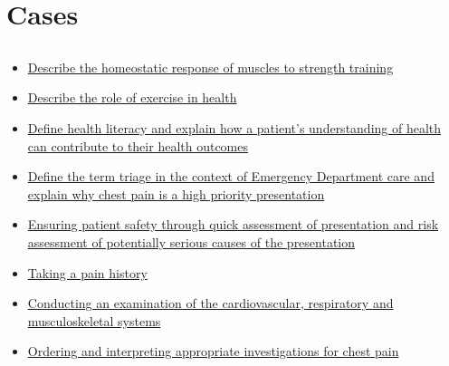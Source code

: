 \documentclass[10pt, a4paper]{article}
\newcommand{\MYhref}[3][blue]{\href{#2}{\color{#1}{#3}}}%
\begin{document}
\section{Cases}
\subsection{\MYhref[melbBlue]{https://notion.so/850b08c0537947a99c56eba6593b1303}{Ben Wesley - Chest Pain [DOMS]}} \begin{itemize} \item \href{https://www.notion.so/0c5126f649f047748dc4d64b4532f80f}{Describe the homeostatic response of muscles to strength training} \item \href{https://www.notion.so/62d5ca06b8964976878b641834967bfb}{Describe the role of exercise in health} \item \href{https://www.notion.so/76d3cd96be864960b318798b9d8bbd64}{Define health literacy and explain how a patient’s understanding of health can contribute to their health outcomes} \item \href{https://www.notion.so/5aec744383eb4ce8b6275d871ff052eb}{Define the term triage in the context of Emergency Department care and explain why chest pain is a high priority presentation} \item \href{https://www.notion.so/8002f730b9b940008cd3561c79255240}{Ensuring patient safety through quick assessment of presentation and risk assessment of potentially serious causes of the presentation} \item \href{https://www.notion.so/072e9c32508043fcb3706c40713c2788}{Taking a pain history} \item \href{https://www.notion.so/a3a64c1db01b49f5b9c88574d17af0ba}{Conducting an examination of the cardiovascular, respiratory and musculoskeletal systems} \item \href{https://www.notion.so/6cd37028ad2840489f4db843c10a9727}{Ordering and interpreting appropriate investigations for chest pain} \end{itemize}
\end{document}
